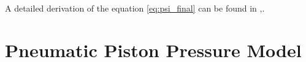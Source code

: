 A detailed derivation of the equation \ref{eq:psi_final} can be found in
\cite{isermann_mech},\cite{fluid}.




%

\section{Pneumatic Piston Pressure Model}

